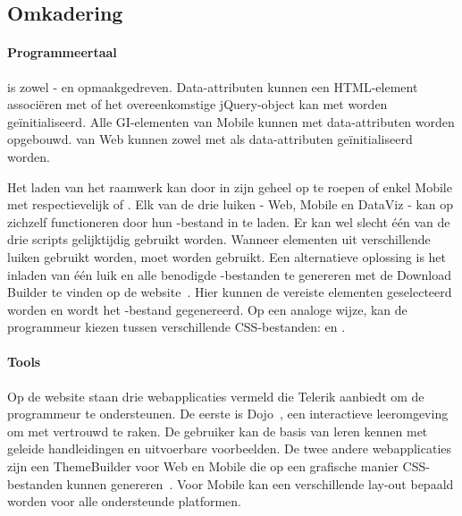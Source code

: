 \subsection{Omkadering}
\label{sec:kendo-omkadering}

\paragraph{Programmeertaal}
\kendo{} is zowel \js{}- en opmaakgedreven. 
Data-attributen kunnen een HTML-element associëren met \kendo{} of het overeenkomstige jQuery-object kan met \js{} worden geïnitialiseerd.
Alle GI-elementen van \kendo{} Mobile kunnen met data-attributen worden opgebouwd.
 van \kendo{} Web kunnen zowel met \js{} als data-attributen geïnitialiseerd worden.

Het laden van het raamwerk kan door \kendo{} in zijn geheel op te roepen of enkel \kendo{} Mobile met respectievelijk  of .
Elk van de drie luiken - Web, Mobile en DataViz - kan op zichzelf functioneren door hun \js{}-bestand in te laden.
Er kan wel slecht één van de drie scripts gelijktijdig gebruikt worden.  
Wanneer elementen uit verschillende luiken gebruikt worden, moet  worden gebruikt.
Een alternatieve oplossing is het inladen van één luik en alle benodigde \js{}-bestanden te genereren met de \js{} Download Builder te vinden op de \kendo{} website~\cite{Telerike}.
Hier kunnen de vereiste elementen geselecteerd worden en wordt het \js{}-bestand gegenereerd.
Op een analoge wijze, kan de programmeur kiezen tussen verschillende CSS-bestanden:   en .

\paragraph{Tools}
Op de \kendo{} website staan drie webapplicaties vermeld die Telerik aanbiedt om de programmeur te ondersteunen.
De eerste is \kendo{} Dojo~\cite{Telerika},  een interactieve leeromgeving om met \kendo{} vertrouwd te raken.
De gebruiker kan de basis van \kendo{} leren kennen met geleide handleidingen en uitvoerbare voorbeelden.
De twee andere webapplicaties zijn een ThemeBuilder voor Web en Mobile die op een grafische manier CSS-bestanden kunnen genereren~\cite{Telerikb,Telerikc}.
Voor \kendo{} Mobile kan een verschillende lay-out bepaald worden voor alle ondersteunde platformen.

